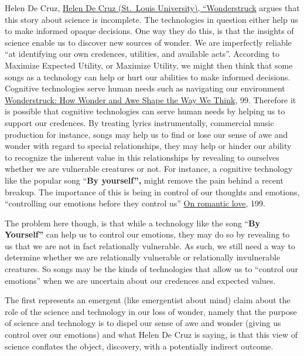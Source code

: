 \documentclass[
  letterpaper,
  DIV=11,
  numbers=noendperiod]{scrartcl}
\begin{document}
Helen De Cruz,
\href{https://app.notion.com/p/Helen-De-Cruz-St-Louis-University-Wonderstruck-34e8935bcf8a81d3bd0bdb8052e66acc?pvs=21}{Helen
De Cruz (St.~Louis University), ``Wonderstruck} argues that this story
about science is incomplete. The technologies in question either help us
to make informed opaque decisions. One way they do this, is that the
insights of science enable us to discover new sources of wonder. We are
imperfectly reliable ``at identifying our own credences, utilities, and
available acts''. According to Maximize Expected Utility, or Maximize
Utility, we might then think that some songs as a technology can help or
hurt our abilities to make informed decisions. Cognitive technologies
serve human needs such as navigating our environment
\href{https://app.notion.com/p/Wonderstruck-How-Wonder-and-Awe-Shape-the-Way-We-Think-3578935bcf8a811f827ae4e1b3d146e4?pvs=21}{Wonderstruck:
How Wonder and Awe Shape the Way We Think}, 99. Therefore it is possible
that cognitive technologies can serve human needs by helping us to
support our credences. By treating lyrics instrumentally, commercial
music production for instance, songs may help us to find or lose our
sense of awe and wonder with regard to special relationships, they may
help or hinder our ability to recognize the inherent value in this
relationships by revealing to ourselves whether we are vulnerable
creatures or not. For instance, a cognitive technology like the popular
song ``\textbf{By yourself'',} might remove the pain behind a recent
breakup. The importance of this is being in control of our thoughts and
emotions, ``controlling our emotions before they control us''
\href{https://app.notion.com/p/On-romantic-love-3398935bcf8a81d9986cd9a47fb55cf8?pvs=21}{On
romantic love}, 199.

The problem here though, is that while a technology like the song
``\textbf{By Yourself''} can help us to control our emotions, they may
do so by revealing to us that we are not in fact relationally
vulnerable. As such, we still need a way to determine whether we are
relationally vulnerable or relationally invulnerable creatures. So songs
may be the kinds of technologies that allow us to ``control our
emotions'' when we are uncertain about our credences and expected
values.

The first represents an emergent (like emergentist about mind) claim
about the role of the science and technology in our loss of wonder,
namely that the purpose of science and technology is to dispel our sense
of awe and wonder (giving us control over our emotions) and what Helen
De Cruz is saying, is that this view of science conflates the object,
discovery, with a potentially indirect outcome.
\end{document}
